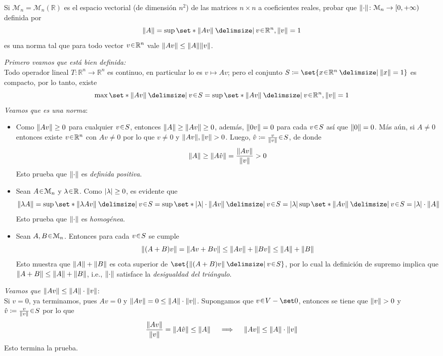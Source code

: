 \begin{ejer}
Si $\mathcal{M}_n = \mathcal{M}_n(\mathbb{R})$ es el espacio vectorial (de dimensión $n^2$) de las matrices $n \times n$ a coeficientes reales, probar que $\norm{\cdot} \colon \mathcal{M}_n \to [0, +\infty)$ definida por
\[
\norm{A} = \sup \set*{ \norm{Av} \given v \en \mathbb{R}^n, \norm{v} = 1 }
\]
es una norma tal que para todo vector $v \en \mathbb{R}^n$ vale $\norm{Av} \leq \norm{A} \norm{v}$.
\end{ejer}
\begin{sol}[Demostración]
\emph{Primero veamos que está bien definida:}\\
Todo operador lineal $T \colon \mathbb{R}^n \to \mathbb{R}^n$ es continuo, en particular lo es $v \mapsto Av$; pero el conjunto $S \coloneq \set{x \en \mathbb{R}^n \given \norm{x} = 1}$ es compacto, por lo tanto, existe
\[
\max \set*{\norm{Av} \given v \en S} = \sup \set*{ \norm{Av} \given v \en \mathbb{R}^n, \norm{v} = 1 }
\]
\emph{Veamos que es una norma}:
\begin{itemize}
\item Como $\norm{Av} \geq 0$ para cualquier $v \en S$, entonces $\norm{A} \geq \norm{Av} \geq 0$, además, $\norm{0v} = 0$ para cada $v \en S$ así que $\norm{0} = 0$. Más aún, si $A \neq 0$ entonces existe $v \en \mathbb{R}^n$ con $Av \neq 0$ por lo que $v\neq0$ y $\norm{Av},\norm{v} > 0$. Luego, $\hat{v} \coloneq \frac{v}{\norm{v}} \en S$, de donde
\[
\norm{A} \geq \norm{A\hat{v}} = \frac{\norm{Av}}{\norm{v}} > 0
\]
Esto prueba que $\norm{\cdot}$ es \emph{definida positiva}.
\item Sean $A \en \mathcal{M}_n$ y $\lambda \en \mathbb{R}$. Como $\abs{\lambda} \geq 0$, es evidente que
\[
\norm{\lambda A} = \sup\set*{\norm{\lambda Av} \given v \en S}%
= \sup\set*{\abs{\lambda} \cdot \norm{Av} \given v \en S}%
= \abs{\lambda}\sup\set*{\norm{Av} \given v \en S}%
= \abs{\lambda}\cdot\norm{A}
\]
Esto prueba que $\norm{\cdot}$ es \emph{homogénea}.

\item Sean $A,B \en \mathcal{M}_n$. Entonces para cada $v \en S$ se cumple
\[
\norm{(A+B)v} = \norm{Av + Bv} \leq \norm{Av} + \norm{Bv} \leq \norm{A} + \norm{B}
\]
Esto muestra que $\norm{A} + \norm{B}$ es cota superior de $\set{\norm{(A+B)v} \given v \en S}$, por lo cual la definición de supremo implica que $\norm{A+B} \leq \norm{A} + \norm{B}$, i.e., $\norm{\cdot}$ satisface la \emph{desigualdad del triángulo}.
\end{itemize}\vspace{1em}
\emph{Veamos que $\norm{Av} \leq \norm{A}\cdot\norm{v}$}:\\
Si $v = 0$, ya terminamos, pues $Av = 0$ y $\norm{Av} = 0 \leq \norm{A}\cdot\norm{v}$. Supongamos que $v \en V - \set0$, entonces se tiene que $\norm{v} > 0$ y $\hat{v} \coloneq \frac{v}{\norm{v}} \en S$ por lo que
\[
\frac{\norm{Av}}{\norm{v}} = \norm{A\hat{v}} \leq \norm{A}%
\quad\implies\quad%
\norm{Av} \leq \norm{A} \cdot \norm{v}
\]
Esto termina la prueba.
\end{sol}

